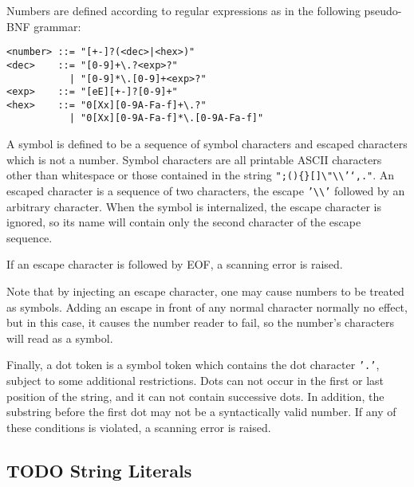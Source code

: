 \documentclass[11pt]{article}
\begin{document}
Numbers are defined according to regular expressions as in the following
pseudo-BNF grammar:

\begin{verbatim}
<number> ::= "[+-]?(<dec>|<hex>)"
<dec>    ::= "[0-9]+\.?<exp>?"
           | "[0-9]*\.[0-9]+<exp>?"
<exp>    ::= "[eE][+-]?[0-9]+"
<hex>    ::= "0[Xx][0-9A-Fa-f]+\.?"
           | "0[Xx][0-9A-Fa-f]*\.[0-9A-Fa-f]"
\end{verbatim}

A symbol is defined to be a sequence of symbol characters and escaped characters
which is not a number. Symbol characters are all printable ASCII characters
other than whitespace or those contained in the string \texttt{";()\{\}[]\textbackslash{}"\textbackslash{}\textbackslash{}'`,."}. An
escaped character is a sequence of two characters, the escape \texttt{'\textbackslash{}\textbackslash{}'} followed by
an arbitrary character. When the symbol is internalized, the escape character is
ignored, so its name will contain only the second character of the escape
sequence.

If an escape character is followed by EOF, a scanning error is raised.

Note that by injecting an escape character, one may cause numbers to be treated
as symbols. Adding an escape in front of any normal character normally no
effect, but in this case, it causes the number reader to fail, so the number's
characters will read as a symbol.

Finally, a dot token is a symbol token which contains the dot character \texttt{'.'},
subject to some additional restrictions. Dots can not occur in the first or last
position of the string, and it can not contain successive dots. In addition, the
substring before the first dot may not be a syntactically valid number. If any
of these conditions is violated, a scanning error is raised.

\subsection{{\bfseries\sffamily TODO} String Literals}
\label{sec:org01888e7}
\end{document}
